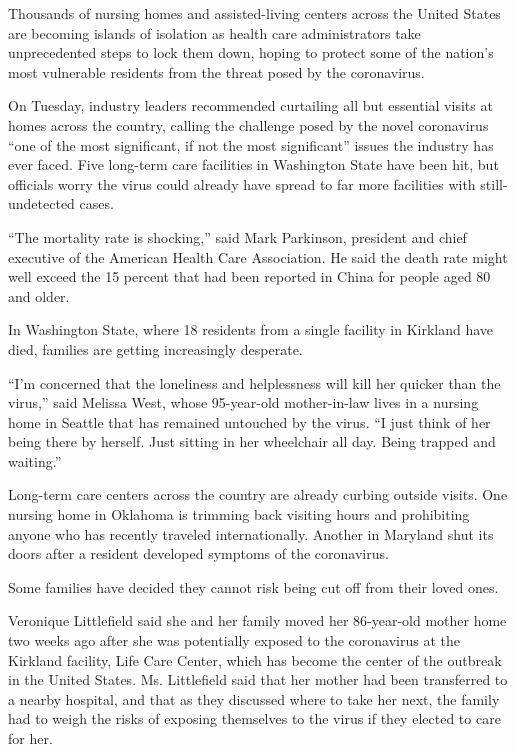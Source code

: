 Thousands of nursing homes and assisted-living centers across the United
States are becoming islands of isolation as health care administrators
take unprecedented steps to lock them down, hoping to protect some of
the nation's most vulnerable residents from the threat posed by the
coronavirus.

On Tuesday, industry leaders recommended curtailing all but essential
visits at homes across the country, calling the challenge posed by the
novel coronavirus ``one of the most significant, if not the most
significant'' issues the industry has ever faced. Five long-term care
facilities in Washington State have been hit, but officials worry the
virus could already have spread to far more facilities with
still-undetected cases.

``The mortality rate is shocking,'' said Mark Parkinson, president and
chief executive of the American Health Care Association. He said the
death rate might well exceed the 15 percent that had been reported in
China for people aged 80 and older.

In Washington State, where 18 residents from a single facility in
Kirkland have died, families are getting increasingly desperate.

``I'm concerned that the loneliness and helplessness will kill her
quicker than the virus,'' said Melissa West, whose 95-year-old
mother-in-law lives in a nursing home in Seattle that has remained
untouched by the virus. ``I just think of her being there by herself.
Just sitting in her wheelchair all day. Being trapped and waiting.''

Long-term care centers across the country are already curbing outside
visits. One nursing home in Oklahoma is trimming back visiting hours and
prohibiting anyone who has recently traveled internationally. Another in
Maryland shut its doors after a resident developed symptoms of the
coronavirus.

Some families have decided they cannot risk being cut off from their
loved ones.

Veronique Littlefield said she and her family moved her 86-year-old
mother home two weeks ago after she was potentially exposed to the
coronavirus at the Kirkland facility, Life Care Center, which has become
the center of the outbreak in the United States. Ms. Littlefield said
that her mother had been transferred to a nearby hospital, and that as
they discussed where to take her next, the family had to weigh the risks
of exposing themselves to the virus if they elected to care for her.

